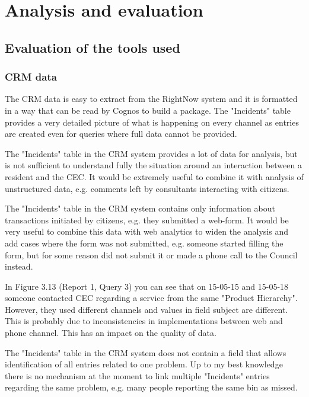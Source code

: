 
\chapter{Analysis and evaluation}
	\section{Evaluation of the tools used}

		\subsection{CRM data}
		
The CRM data is easy to extract from the RightNow system and it is formatted in a way that can be read by Cognos to build a package. The "Incidents" table provides a very detailed picture of what is happening on every channel as entries are created even for queries where full data cannot be provided.

The "Incidents" table in the CRM system provides a lot of data for analysis, but is not sufficient to understand fully the situation around an interaction between a resident and the CEC. It would be extremely useful to combine it with analysis of unstructured data, e.g. comments left by consultants interacting with citizens.

The "Incidents" table in the CRM system contains only information about transactions initiated by citizens, e.g. they submitted a web-form. It would be very useful to combine this data with web analytics to widen the analysis and add cases where the form was not submitted, e.g. someone started filling the form, but for some reason did not submit it or made a phone call to the Council instead.

In Figure 3.13 (Report 1, Query 3) you can see that on 15-05-15 and 15-05-18 someone contacted CEC regarding a service from the same "Product Hierarchy". However, they used different channels and values in field subject are different. This is probably due to inconsistencies in implementations between web and phone channel. This has an impact on the quality of data. 

The "Incidents" table in the CRM system does not contain a field that allows identification of all entries related to one problem. Up to my best knowledge there is no mechanism at the moment to link multiple "Incidents" entries regarding the same problem, e.g. many people reporting the same bin as missed. 

